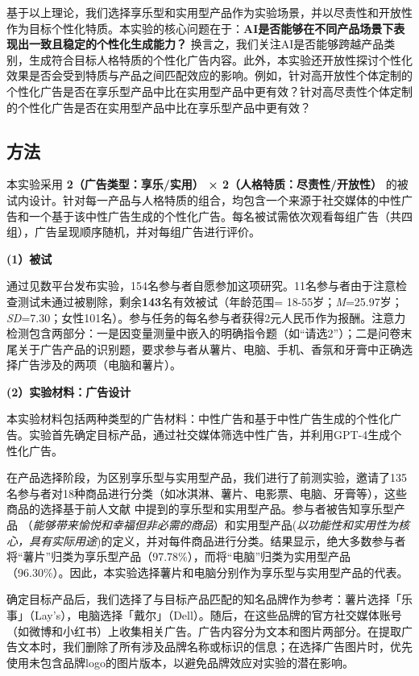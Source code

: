 基于以上理论，我们选择享乐型和实用型产品作为实验场景，并以尽责性和开放性作为目标个性化特质。本实验的核心问题在于：\textbf{AI是否能够在不同产品场景下表现出一致且稳定的个性化生成能力？} 换言之，我们关注AI是否能够跨越产品类别，生成符合目标人格特质的个性化广告内容。此外，本实验还开放性探讨个性化效果是否会受到特质与产品之间匹配效应的影响。例如，针对高开放性个体定制的个性化广告是否在享乐型产品中比在实用型产品中更有效？针对高尽责性个体定制的个性化广告是否在实用型产品中比在享乐型产品中更有效？

\subsection{方法}
\label{study1-substudy2-methods}

本实验采用 \textbf{2（广告类型：享乐/实用） × 2（人格特质：尽责性/开放性）} 的被试内设计。针对每一产品与人格特质的组合，均包含一个来源于社交媒体的中性广告和一个基于该中性广告生成的个性化广告。每名被试需依次观看每组广告（共四组），广告呈现顺序随机，并对每组广告进行评价。

\textbf{(1）被试}

通过见数平台发布实验，154名参与者自愿参加这项研究。11名参与者由于注意检查测试未通过被剔除，剩余\textbf{143}名有效被试（年龄范围= 18-55岁；\textit{M}=25.97岁；\textit{SD}=7.30；女性101名）。参与任务的每名参与者获得2元人民币作为报酬。注意力检测包含两部分：一是因变量测量中嵌入的明确指令题（如“请选2”）；二是问卷末尾关于广告产品的识别题，要求参与者从薯片、电脑、手机、香氛和牙膏中正确选择广告涉及的两项（电脑和薯片）。


\textbf{(2）实验材料：广告设计}

本实验材料包括两种类型的广告材料：中性广告和基于中性广告生成的个性化广告。实验首先确定目标产品，通过社交媒体筛选中性广告，并利用GPT-4生成个性化广告。

在产品选择阶段，为区别享乐型与实用型产品，我们进行了前测实验，邀请了135名参与者对18种商品进行分类（如冰淇淋、薯片、电影票、电脑、牙膏等），这些商品的选择基于前人文献\citep[如][]{huettl2012visual} 中提到的享乐型和实用型产品。参与者被告知享乐型产品 （\textit{能够带来愉悦和幸福但非必需的商品}）和实用型产品(\textit{以功能性和实用性为核心，具有实际用途})的定义，并对每件商品进行分类。结果显示，绝大多数参与者将“薯片”归类为享乐型产品（97.78\%），而将“电脑”归类为实用型产品（96.30\%）。因此，本实验选择薯片和电脑分别作为享乐型与实用型产品的代表。

确定目标产品后，我们选择了与目标产品匹配的知名品牌作为参考：薯片选择「乐事」（Lay’s），电脑选择「戴尔」（Dell）。随后，在这些品牌的官方社交媒体账号（如微博和小红书）上收集相关广告。广告内容分为文本和图片两部分。在提取广告文本时，我们删除了所有涉及品牌名称或标识的信息；在选择广告图片时，优先使用未包含品牌logo的图片版本，以避免品牌效应对实验的潜在影响。

